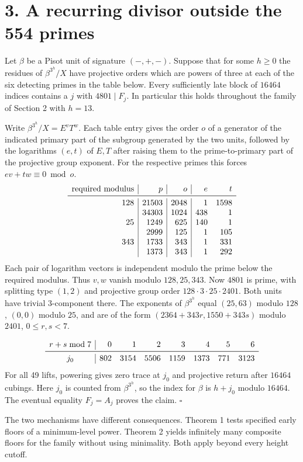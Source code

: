 \documentclass[11pt,a4paper,oneside,openany]{book}
\newcommand{\localhead}[1]{\needspace{5\baselineskip}\section*{\color{ink}#1}}
\let\sect\localhead\let\secx\localhead\let\head\localhead
\begin{document}
\sect{3. A recurring divisor outside the 554 primes}
 Let $\beta$ be a Pisot unit of signature $(-,+,-)$. Suppose that for some $h\ge0$ the residues of $\beta^{3^h}/X$ have projective orders which are powers of three at each of the six detecting primes in the table below. Every sufficiently late block of $16464$ indices contains a $j$ with $4801\mid F_j$. In particular this holds throughout the family of Section 2 with $h=13$.

 Write $\beta^{3^h}/X=E^vT^w$. Each table entry gives the order $o$ of a generator of the indicated primary part of the subgroup generated by the two units, followed by the logarithms $(e,t)$ of $E,T$ after raising them to the prime-to-primary part of the projective group exponent. For the respective primes this forces $ev+tw\equiv0\bmod o$.
\[
\begin{array}{r|r|r|rr}
\text{required modulus}&p&o&e&t\\\midrule
128&21503&2048&1&1598\\
&34303&1024&438&1\\
25&1249&625&140&1\\
&2999&125&1&105\\
343&1733&343&1&331\\
&1373&343&1&292
\end{array}
\]
Each pair of logarithm vectors is independent modulo the prime below the required modulus. Thus $v,w$ vanish modulo $128,25,343$. Now $4801$ is prime, with splitting type $(1,2)$ and projective group order $128\cdot3\cdot25\cdot2401$. Both units have trivial $3$-component there. The exponents of $\beta^{3^h}$ equal $(25,63)$ modulo $128$, $(0,0)$ modulo $25$, and are of the form $(2364+343r,1550+343s)$ modulo $2401$, $0\le r,s<7$.

\[
\begin{array}{c|rrrrrrr}
r+s\bmod7&0&1&2&3&4&5&6\\\midrule
j_0&802&3154&5506&1159&1373&771&3123
\end{array}
\]
For all 49 lifts, powering gives zero trace at $j_0$ and projective return after $16464$ cubings. Here $j_0$ is counted from $\beta^{3^h}$, so the index for $\beta$ is $h+j_0$ modulo $16464$. The eventual equality $F_j=A_j$ proves the claim. \hfill$\square$

The two mechanisms have different consequences. Theorem 1 tests specified early floors of a minimum-level power. Theorem 2 yields infinitely many composite floors for the family without using minimality. Both apply beyond every height cutoff.
\end{document}
